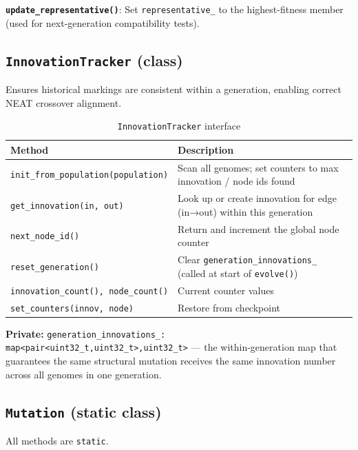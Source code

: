 \textbf{\texttt{update\_representative()}}: Set \texttt{representative\_} to the
highest-fitness member (used for next-generation compatibility tests).

\subsection{\texttt{InnovationTracker} (class)}

Ensures historical markings are consistent within a generation, enabling correct NEAT
crossover alignment.

\begin{table}[H]
\centering\small
\caption{\texttt{InnovationTracker} interface}
\begin{tabularx}{\textwidth}{@{}lX@{}}
\toprule
\textbf{Method} & \textbf{Description} \\
\midrule
\texttt{init\_from\_population(population)} & Scan all genomes; set counters to max innovation / node ids found \\
\texttt{get\_innovation(in, out)} & Look up or create innovation for edge (in→out) within this generation \\
\texttt{next\_node\_id()} & Return and increment the global node counter \\
\texttt{reset\_generation()} & Clear \texttt{generation\_innovations\_} (called at start of \texttt{evolve()}) \\
\texttt{innovation\_count(), node\_count()} & Current counter values \\
\texttt{set\_counters(innov, node)} & Restore from checkpoint \\
\bottomrule
\end{tabularx}
\end{table}

\textbf{Private:} \texttt{generation\_innovations\_: map<pair<uint32\_t,uint32\_t>,uint32\_t>}
— the within-generation map that guarantees the same structural mutation receives the
same innovation number across all genomes in one generation.

\subsection{\texttt{Mutation} (static class)}

All methods are \texttt{static}.

